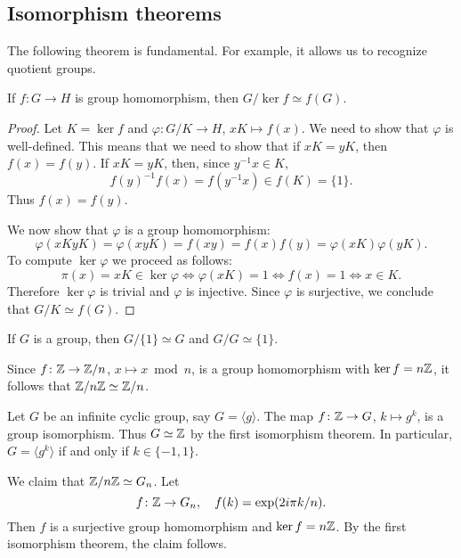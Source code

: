 \subsection{Isomorphism theorems}

The following theorem is fundamental. For example, it allows us to recognize quotient groups. 

\begin{theorem}
If $f\colon G\to H$ is group homomorphism, then $G/\ker f\simeq f(G)$.
\end{theorem}

\begin{proof}
    Let $K=\ker f$ and $\varphi\colon G/K\to H$, $xK\mapsto f(x)$. We need to show that $\varphi$ is well-defined. This means that
    we need to show that if $xK=yK$, then $f(x)=f(y)$. If $xK=yK$, then, since $y^{-1}x\in K$, 
    \[
        f(y)^{-1}f(x)=f(y^{-1}x)\in f(K)=\{1\}.
    \]
    Thus $f(x)=f(y)$.

    We now show that $\varphi$ is a group homomorphism: 
        \[
        \varphi(xKyK)=\varphi(xyK)=f(xy)=f(x)f(y)=\varphi(xK)\varphi(yK).
        \]
    To compute $\ker\varphi$ we proceed as follows: 
        \[
        \pi(x)=xK\in\ker\varphi\Longleftrightarrow \varphi(xK)=1
        \Longleftrightarrow f(x)=1
        \Longleftrightarrow x\in K.
        \]
    Therefore  $\ker\varphi$ is trivial and
    $\varphi$ is injective. Since $\varphi$ is surjective, 
    we conclude that $G/K\simeq f(G)$.
\end{proof}

If $G$ is a group, then $G/\{1\}\simeq G$ and $G/G\simeq\{1\}$.

\begin{example}
Since $f\colon\mathbb{Z}\to\mathbb{Z}/n$, $x\mapsto x\bmod n$, is a group homomorphism
with $\ker f=n\mathbb{Z}$, it follows that 
$\mathbb{Z}/n\mathbb{Z}\simeq\mathbb{Z}/n$.
\end{example}

\begin{example}
Let $G$ be an infinite cyclic group, say $G=\langle g\rangle$. The map 
$f \colon\mathbb{Z}\to G$, $k\mapsto g^k$,
is a group isomorphism. Thus $G\simeq\mathbb{Z}$ by the first isomorphism theorem. In particular, $G=\langle g^k\rangle$ if and only if 
 $k\in\{-1,1\}$.
\end{example}

\begin{example}
We claim that $\mathbb{Z}/n\mathbb{Z}\simeq G_n$. Let 
\[
f\colon\mathbb{Z}\to G_n,\quad
f(k)=\exp(2i\pi k/n).
\]
Then $f$ is a surjective group homomorphism and
$\ker f=n\mathbb{Z}$. By the first isomorphism theorem, the claim follows. 
\end{example}

